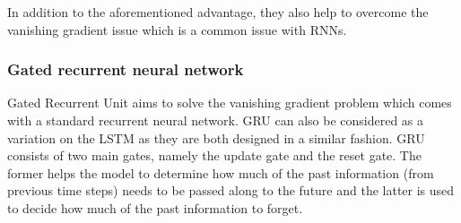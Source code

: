 \documentclass[8pt,conference,compsocconf]{IEEEtran}
\begin{document}
In addition to the aforementioned advantage, they also help to overcome the vanishing gradient issue which is a common issue with RNNs.

\subsubsection{Gated recurrent neural network}
Gated Recurrent Unit aims to solve the vanishing gradient problem which comes with a standard recurrent neural network. GRU can also be considered as a variation on the LSTM as they are both designed in a similar fashion. GRU consists of two main gates, namely the update gate and the reset gate. The former helps the model to determine how much of the past information (from previous time steps) needs to be passed along to the future and the latter is used to decide how much of the past information to forget. 
\end{document}
